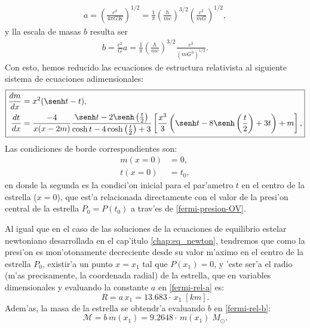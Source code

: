 \begin{align}\label{fermi-rel-a}
 a=\left(\frac{c^4}{4\pi G K}\right)^{1/2}=\frac{1}{\pi}\left(\frac{h}{mc}\right)^{3/2}\left(\frac{c^2}{mG}\right)^{1/2},
\end{align}
y lla escala de masas $b$ resulta ser
\begin{align}\label{fermi-rel-b}
 b=\frac{c^2}{G}a=\frac{1}{\pi}\left(\frac{h}{mc}\right)^{3/2}\frac{c^3}{(mG^3)^{1/2}}.
\end{align}
Con esto, hemos reducido las ecuaciones de estructura relativista al siguiente sistema de ecuaciones adimensionales:
\begin{equation}\label{fermi-rel-sistema}
\boxed{
\begin{aligned}
\frac{dm}{dx}&=x^2(\senh t-t),\\
\frac{dt}{dx}&=\frac{-4}{x(x-2m)}\frac{\senh t-2\senh\left(\frac{t}{2}\right)}{\cosh t-4\cosh \left(\frac{t}{2}\right)+3}\left[ \frac{x^3}{3}\left(\senh t-8\senh \left(\frac{t}{2}\right)+3t\right)+m\right],
\end{aligned}}
\end{equation}
Las condiciones de borde correspondientes son:
\begin{align}
 m(x=0)&=0,\\
t(x=0)&=t_0,
\end{align}
en donde la segunda es la condici'on inicial para el par'ametro $t$ en el centro de la estrella ($x=0$), que est'a relacionada directamente con el valor de la presi'on central de la estrella $P_0=P(t_0)$ a trav'es de \eqref{fermi-presion-OV}.

Al igual que en el caso de las soluciones de la ecuaciones de equilibrio estelar newtoniano desarrollada en el cap'itulo \ref{chap:eq_newton}, tendremos que como la presi'on es mon'otonamente decreciente desde su valor m'aximo en el centro de la estrella $P_0$, existir'a un punto $x=x_1$ tal que $P(x_1)=0$, y 'este ser'a el radio (m'as precisamente, la coordenada radial) de la estrella, que en variables dimensionales y evaluando la constante $a$ en \eqref{fermi-rel-a} es:
\begin{equation}\label{fermi-rel-radio}
 R=a\, x_1
= 13.683\cdot\,x_1\;[km].
\end{equation}
Adem'as, la masa de la estrella se obtendr'a evaluando $b$ en \eqref{fermi-rel-b}:
\begin{equation}\label{fermi-rel-masa}
\mathcal{M}=b\,m(x_1)=9.2648\cdot\,m(x_1)\;M_{\odot}.
\end{equation}

